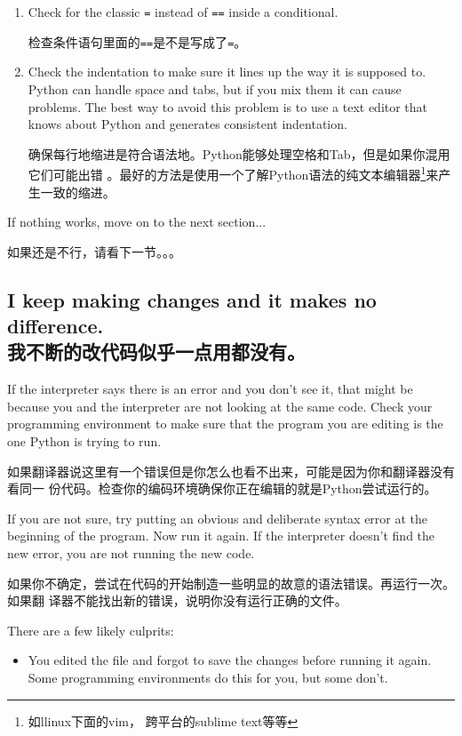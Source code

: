 \documentclass[10pt]{book}
\begin{document}
\begin{CJK}{UTF8}{gbsn}
\begin{enumerate}
\item Check for the classic {\tt =} instead of {\tt ==} inside
a conditional.

检查条件语句里面的{\tt ==}是不是写成了{\tt =}。

\item Check the indentation to make sure it lines up the way it
is supposed to.  Python can handle space and tabs, but if you mix
them it can cause problems.  The best way to avoid this problem
is to use a text editor that knows about Python and generates
consistent indentation.

确保每行地缩进是符合语法地。Python能够处理空格和Tab，但是如果你混用它们可能出错
。最好的方法是使用一个了解Python语法的纯文本编辑器\footnote{如llinux下面的vim，
跨平台的sublime text等等}来产生一致的缩进。

\end{enumerate}

If nothing works, move on to the next section...

如果还是不行，请看下一节。。。


\subsection{I keep making changes and it makes no difference. \\ 我不断的改代码似乎一点用都没有。}

If the interpreter says there is an error and you don't see it, that
might be because you and the interpreter are not looking at the same
code.  Check your programming environment to make sure that the
program you are editing is the one Python is trying to run.

如果翻译器说这里有一个错误但是你怎么也看不出来，可能是因为你和翻译器没有看同一
份代码。检查你的编码环境确保你正在编辑的就是Python尝试运行的。

If you are not sure, try putting an obvious and deliberate syntax
error at the beginning of the program.  Now run it again.  If the
interpreter doesn't find the new error, you are not running the
new code.

如果你不确定，尝试在代码的开始制造一些明显的故意的语法错误。再运行一次。如果翻
译器不能找出新的错误，说明你没有运行正确的文件。

There are a few likely culprits:

\begin{itemize}

\item You edited the file and forgot to save the changes before
running it again.  Some programming environments do this
for you, but some don't.


\end{itemize}
\end{CJK}
\end{document}
